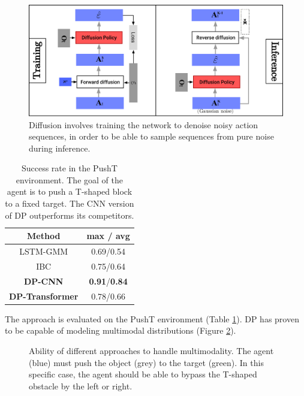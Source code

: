 \begin{figure}
    \centering
    \includegraphics[width=\linewidth]{figures/diffusion.pdf}
    \caption{Diffusion involves training the network to denoise noisy action sequences,
    in order to be able to sample sequences from pure noise during inference.}
    \label{fig:diffusion}
\end{figure}
\begin{table}[!htb]
    \centering
    \begin{tabular}{c|c}
        \textbf{Method} & max / avg \\
        \hline
        LSTM-GMM & 0.69/0.54 \\
        IBC & 0.75/0.64 \\
        \textbf{DP-CNN} & \textbf{0.91}/\textbf{0.84} \\
        \textbf{DP-Transformer} & 0.78/0.66
    \end{tabular}
    \caption{Success rate in the PushT environment. The goal of the agent is to push a T-shaped
    block to a fixed target. The CNN version of DP outperforms its competitors.}
    \label{tab:success_rate}
\end{table}
The approach is evaluated on the PushT environment (Table \ref{tab:success_rate}).
DP has proven to be capable of modeling multimodal distributions (Figure \ref{fig:multimodality}).
\begin{figure}
    \centering
    \caption{Ability of different approaches to handle multimodality. The agent (blue) must push the
    object (grey) to the target (green). In this specific case, the agent should be able to bypass the
    T-shaped obstacle by the left or right.}
    \label{fig:multimodality}
\end{figure}

